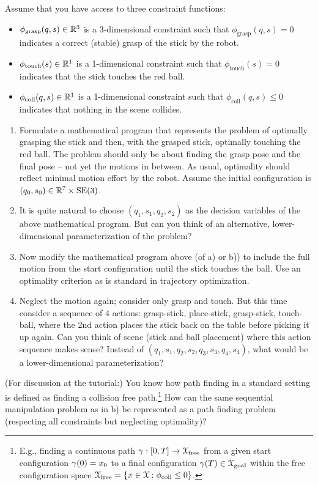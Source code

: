 Assume that you have access to three constraint functions:
\begin{itemize}
\item $\phi_\text{grasp}(q,s) \in{\mathbb{R}}^3$ is a 3-dimensional constraint such
that $\phi_\text{grasp}(q,s)=0$ indicates a correct (stable) grasp of
the stick by the robot.
\item $\phi_\text{touch}(s) \in {\mathbb{R}}^1$ is a 1-dimensional constraint
such that $\phi_\text{touch}(s)=0$ indicates that the stick touches
the red ball.
\item $\phi_\text{coll}(q,s) \in {\mathbb{R}}^1$ is a 1-dimensional constraint
such that $\phi_\text{coll}(q,s)\le 0$ indicates that nothing in the
scene collides.
\end{itemize}
\begin{enumerate}
\item Formulate a mathematical program that represents the problem of
optimally grasping the stick and then, with the grasped stick,
optimally touching the red ball. The problem should only be about finding
the grasp pose and the final pose -- not yet the motions in between. As usual, optimality should reflect minimal motion effort by the robot. Assume the initial
configuration is $(q_0,s_0) \in {\mathbb{R}}^7\times \text{SE}(3)$.


\item It is quite natural to choose $(q_1,s_1,q_2,s_2)$ as the decision
variables of the above mathematical program. But can you think of an
alternative, lower-dimensional parameterization of the problem?


\item Now modify the mathematical program above (of a) or b)) to
include the full motion from the start configuration until the stick touches the
ball. Use an optimality criterion as is standard in trajectory
optimization.


\item Neglect the motion again; consider only grasp and touch. But
this time consider a sequence of 4 actions: grasp-stick, place-stick,
grasp-stick, touch-ball, where the 2nd action places the stick back on
the table before picking it up again. Can you think of scene (stick
and ball placement) where
this action sequence makes sense? Instead of
$(q_1,s_1,q_2,s_2,q_3,s_3,q_4,s_4)$, what would be a lower-dimensional
parameterization?

\end{enumerate}

(For discussion at the tutorial:) You know how path
finding in a standard setting is defined as finding a collision free
path.\footnote{E.g., finding a continuous path $\gamma:
[0,T]\to {\cal X}_\text{free}$ from a given start configuration $\gamma(0)=x_0$
to a final configuration $\gamma(T) \in {\cal X}_\text{goal}$ within the free
configuration space ${\cal X}_\text{free} = \{ x\in{\cal X}: \phi_\text{coll}\le
0\}$.} How can the same sequential manipulation problem as in b) be
represented as a path finding problem (respecting all constraints but
neglecting optimality)?


\ifthenelse{\isundefined{\scripthead}}{


}{}


\exerfoot
